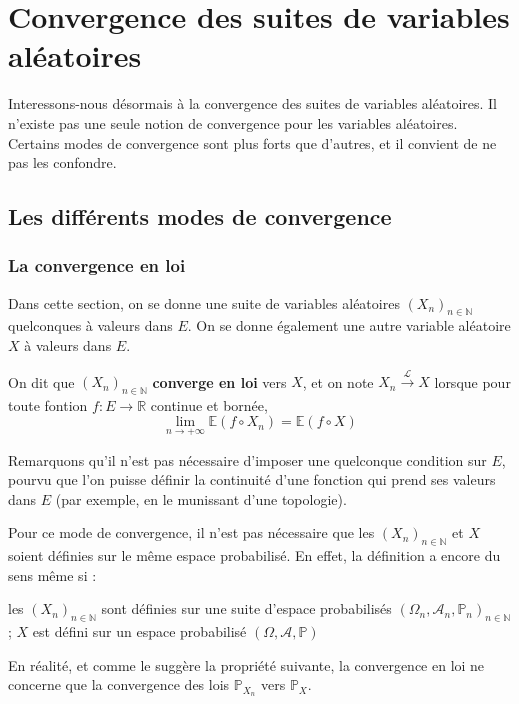 \documentclass[../integ-proba.tex]{subfiles}
\begin{document}
    \chapter{Convergence des suites de variables aléatoires}

    Interessons-nous désormais à la convergence des suites de variables aléatoires.
    Il n'existe pas une seule notion de convergence pour les variables aléatoires.
    Certains modes de convergence sont plus forts que d'autres, et il convient de ne pas les confondre.

    \section{Les différents modes de convergence}

    \subsection{La convergence en loi}

    Dans cette section, on se donne une suite de variables aléatoires $\left(X_n\right)_{n\in\mathbb{N}}$ quelconques à valeurs dans $E$.
    On se donne également une autre variable aléatoire $X$ à valeurs dans $E$.

    \begin{defi}
        On dit que $\left(X_n\right)_{n\in\mathbb{N}}$ \textbf{converge en loi} vers $X$, et on note $X_n \xrightarrow[]{\mathcal{L}} X$ lorsque pour toute fontion $f:E \rightarrow \mathbb{R}$ continue et bornée,
        $$
        \lim_{n \to +\infty} \mathbb{E}\left(f \circ X_n\right) = \mathbb{E}\left(f \circ X\right)
        $$
    \end{defi}

    \begin{rem}
        Remarquons qu'il n'est pas nécessaire d'imposer une quelconque condition sur $E$, pourvu que l'on puisse définir la continuité d'une fonction qui prend ses valeurs dans $E$ (par exemple, en le munissant d'une topologie).
    \end{rem}

    \begin{rem}
        Pour ce mode de convergence, il n'est pas nécessaire que les $\left(X_n\right)_{n\in\mathbb{N}}$ et $X$ soient définies sur le même espace probabilisé.
        En effet, la définition a encore du sens même si :
        \begin{itemize}
        \itemb les $\left(X_n\right)_{n\in\mathbb{N}}$ sont définies sur une suite d'espace probabilisés $\left(\Omega_n, \mathcal{A}_n, \mathbb{P}_n\right)_{n \in \mathbb{N}}$ ;
        \itemb $X$ est défini sur un espace probabilisé $\left(\Omega, \mathcal{A}, \mathbb{P}\right)$
        \end{itemize}

        En réalité, et comme le suggère la propriété suivante, la convergence en loi ne concerne que la convergence des lois $\mathbb{P}_{X_n}$ vers $\mathbb{P}_X$.
    \end{rem}
\end{document}
